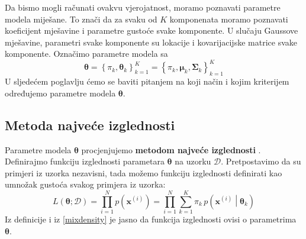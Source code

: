 \documentclass[times, utf8, zavrsni]{fer}
\begin{document}
Da bismo mogli računati ovakvu vjerojatnost, moramo poznavati parametre modela miješane. To znači da za svaku od $K$ komponenata moramo poznavati koeficijent mješavine i parametre gustoće svake komponente. U slučaju Gaussove mješavine, parametri svake komponente su lokacije i kovarijacijske matrice svake komponente. Označimo parametre modela sa
\[\boldsymbol{\theta} 
= \left\{ \pi_k, \boldsymbol{\theta}_k \right\}_{k=1}^{K}
= \left\{ \pi_k, \boldsymbol{\mu}_k, \boldsymbol{\Sigma}_k \right\}_{k=1}^{K}
\]
U sljedećem poglavlju ćemo se baviti pitanjem na koji način i kojim kriterijem određujemo parametre modela $\boldsymbol{\theta}$.

\subsection{Metoda najveće izglednosti}
Parametre modela $\boldsymbol{\theta}$ procjenjujemo \textbf{metodom najveće izglednosti} . Definirajmo funkciju izglednosti parametara $\boldsymbol{\theta}$ na uzorku $\mathcal{D}$. Pretpostavimo da su primjeri iz uzorka nezavisni, tada možemo funkciju izglednosti definirati kao umnožak gustoća svakog primjera iz uzorka:
\[L \left(\boldsymbol{\theta} ; \mathcal{D} \right)
= \prod_{i=1}^{N} p \left( \mathbf{x}^{(i)} \right)
= \prod_{i=1}^{N} 
\sum_{k=1}^{K} \pi_k \, p \left(\mathbf{x}^{(i)} \middle| \boldsymbol{\theta}_k\right)
\]
Iz definicije i iz \ref{mixdensity} je jasno da funkcija izglednosti ovisi o parametrima $\boldsymbol{\theta}$.
\end{document}
